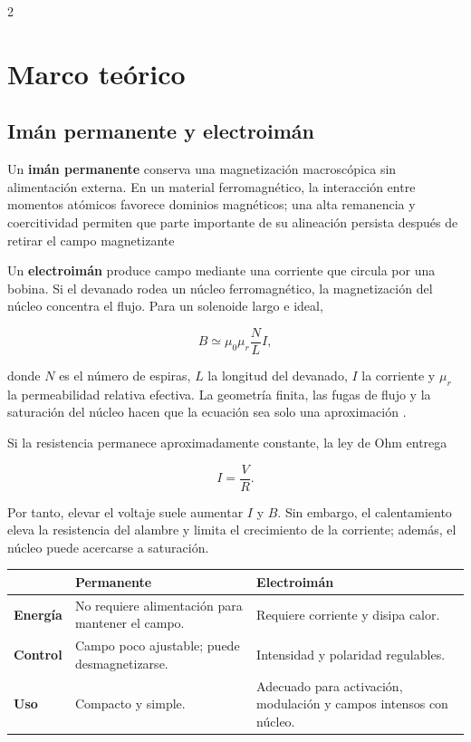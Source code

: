 \documentclass[10pt,letterpaper]{article}
\begin{document}
\begin{multicols}{2}
\section{Marco teórico}

\subsection{Imán permanente y electroimán}

Un \textbf{imán permanente} conserva una magnetización macroscópica sin alimentación externa. En un material ferromagnético, la interacción entre momentos atómicos favorece dominios magnéticos; una alta remanencia y coercitividad permiten que parte importante de su alineación persista después de retirar el campo magnetizante 

Un \textbf{electroimán} produce campo mediante una corriente que circula por una bobina. Si el devanado rodea un núcleo ferromagnético, la magnetización del núcleo concentra el flujo. Para un solenoide largo e ideal,

\begin{equation}
  B \simeq \mu_0\mu_r\frac{N}{L}I,
  \label{eq:solenoide}
\end{equation}

donde $N$ es el número de espiras, $L$ la longitud del devanado, $I$ la corriente y $\mu_r$ la permeabilidad relativa efectiva. La geometría finita, las fugas de flujo y la saturación del núcleo hacen que la ecuación sea solo una aproximación \cite{griffiths2017}.

Si la resistencia permanece aproximadamente constante, la ley de Ohm entrega

\begin{equation}
  I=\frac{V}{R}.
  \label{eq:ohm}
\end{equation}

Por tanto, elevar el voltaje suele aumentar $I$ y $B$. Sin embargo, el calentamiento eleva la resistencia del alambre y limita el crecimiento de la corriente; además, el núcleo puede acercarse a saturación.

\begin{center}
\small
\begin{tabularx}{\columnwidth}{@{}>{\bfseries}p{}XX@{}}
\toprule
 & Permanente & Electroimán \\
\midrule
Energía & No requiere alimentación para mantener el campo. & Requiere corriente y disipa calor. \\
Control & Campo poco ajustable; puede desmagnetizarse. & Intensidad y polaridad regulables. \\
Uso & Compacto y simple. & Adecuado para activación, modulación y campos intensos con núcleo. \\
\bottomrule
\end{tabularx}
\label{tab:imanes}
\end{center}


\end{multicols}
\end{document}
